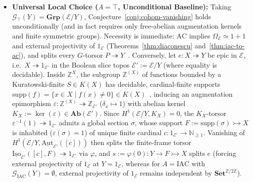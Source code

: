 \begin{itemize}

  \item \textbf{Universal Local Choice ($A = \top$, Unconditional Baseline):} Taking $\mathcal{G}_\top(Y) = \mathbf{Grp}(\mathcal{E}/Y)$, Conjecture~\ref{conj:cohom-vanishing} holds unconditionally (and in fact requires only free-abelian augmentation kernels and finite symmetric groups). Necessity is immediate: $\mathrm{AC}$ implies $\Omega_{\mathcal{E}} \simeq 1+1$ and external projectivity of $1_{\mathcal{E}}$ (Theorems~\ref{thm:diaconescu} and~\ref{thm:iac-to-ac}), and splits every $G$-torsor $P \twoheadrightarrow Y$~\cite{Giraud71}. Conversely, let $e : X \twoheadrightarrow Y$ be epic in $\mathcal{E}$, i.e.\ $X \twoheadrightarrow 1_{\mathcal{E}'}$ in the Boolean slice topos $\mathcal{E}' := \mathcal{E}/Y$ (where equality is decidable). Inside $\mathbb{Z}^X$, the subgroup $\mathbb{Z}^{(X)}$ of functions bounded by a Kuratowski-finite $S \in K(X)$ has decidable, cardinal-finite supports $\mathrm{supp}(f) = \{x \in X \mid f(x) \neq 0\} \in K(X)$~\cite[\S\S D5.2,~D5.4]{Johnstone02}, inducing an augmentation epimorphism $\varepsilon : \mathbb{Z}^{(X)} \twoheadrightarrow \mathbb{Z}_{\mathcal{E}'}$ ($\delta_x \mapsto 1$) with abelian kernel $K_X := \ker(\varepsilon) \in \mathbf{Ab}(\mathcal{E}')$. Since $H^1(\mathcal{E}/Y, K_X) = 0$, the $K_X$-torsor $\varepsilon^{-1}(1) \twoheadrightarrow 1_{\mathcal{E}'}$ admits a global section $\sigma$, whose support $F := \mathrm{supp}(\sigma) \rightarrowtail X$ is inhabited ($\varepsilon(\sigma) = 1$) of unique finite cardinal $c : 1_{\mathcal{E}'} \to \mathbb{N}_{\ge 1}$. Vanishing of $H^1(\mathcal{E}/Y, \underline{\mathrm{Aut}}_{\mathcal{E}'}([c]))$ then splits the finite-frame torsor $\underline{\mathrm{Iso}}_{\mathcal{E}'}([c], F) \twoheadrightarrow 1_{\mathcal{E}'}$ via $\varphi$, and $s := \varphi(0) : Y \to F \rightarrowtail X$ splits $e$ (forcing external projectivity of $1_{\mathcal{E}}$ at $Y = 1_{\mathcal{E}}$, whereas for $A = \mathrm{IAC}$ with $\mathcal{G}_{\mathrm{IAC}}(Y) = \emptyset$, external projectivity of $1_{\mathcal{E}}$ remains independent by $\mathbf{Set}^{\mathbb{Z}/2\mathbb{Z}}$).


\end{itemize}
